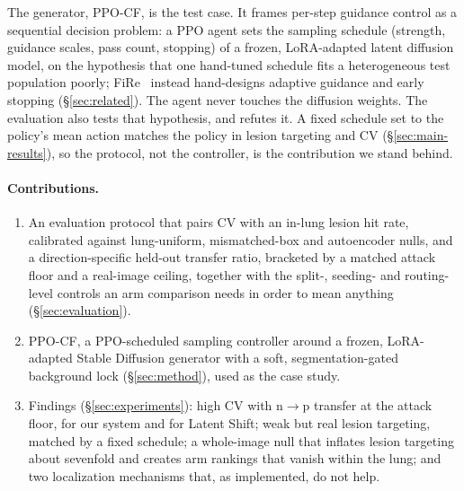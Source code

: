 The generator, PPO-CF, is the test case. It frames per-step guidance control as a sequential decision problem: a PPO agent sets the sampling schedule (strength, guidance scales, pass count, stopping) of a frozen, LoRA-adapted latent diffusion model, on the hypothesis that one hand-tuned schedule fits a heterogeneous test population poorly; FiRe~\cite{zeng2026fire} instead hand-designs adaptive guidance and early stopping (\S\ref{sec:related}). The agent never touches the diffusion weights. The evaluation also tests that hypothesis, and refutes it. A fixed schedule set to the policy's mean action matches the policy in lesion targeting and CV (\S\ref{sec:main-results}), so the protocol, not the controller, is the contribution we stand behind.

\paragraph{Contributions.}
\begin{enumerate}
    \item An evaluation protocol that pairs CV with an in-lung lesion hit rate, calibrated against lung-uniform, mismatched-box and autoencoder nulls, and a direction-specific held-out transfer ratio, bracketed by a matched attack floor and a real-image ceiling, together with the split-, seeding- and routing-level controls an arm comparison needs in order to mean anything (\S\ref{sec:evaluation}).
    \item PPO-CF, a PPO-scheduled sampling controller around a frozen, LoRA-adapted Stable Diffusion generator with a soft, segmentation-gated background lock (\S\ref{sec:method}), used as the case study.
    \item Findings (\S\ref{sec:experiments}): high CV with n$\to$p transfer at the attack floor, for our system and for Latent Shift; weak but real lesion targeting, matched by a fixed schedule; a whole-image null that inflates lesion targeting about sevenfold and creates arm rankings that vanish within the lung; and two localization mechanisms that, as implemented, do not help.
\end{enumerate}
